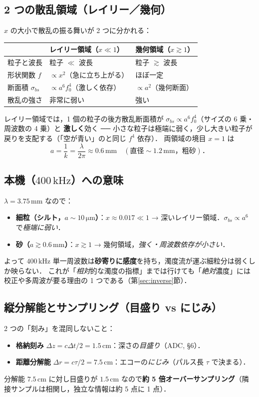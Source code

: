 \documentclass[11pt]{ltjsarticle}
\newcommand{\unit}[1]{\,\mathrm{#1}}
\begin{document}
\subsection{2 つの散乱領域（レイリー／幾何）}
$x$ の大小で散乱の振る舞いが 2 つに分かれる：
\begin{center}\small
\begin{tabular}{lll}
\toprule
 & レイリー領域（$x\ll1$） & 幾何領域（$x\gtrsim1$） \\
\midrule
粒子と波長 & 粒子 $\ll$ 波長 & 粒子 $\gtrsim$ 波長 \\
形状関数 $f$ & $\propto x^2$（急に立ち上がる） & ほぼ一定 \\
断面積 $\sigma_{bs}$ & $\propto a^6 f_0^4$（激しく依存） & $\propto a^2$（幾何断面） \\
散乱の強さ & 非常に弱い & 強い \\
\bottomrule
\end{tabular}
\end{center}
レイリー領域では，1 個の粒子の後方散乱断面積が $\sigma_{bs}\propto a^6 f_0^4$（サイズの 6 乗・周波数の 4 乗）と
\textbf{激しく}効く ── 小さな粒子は極端に弱く，少し大きい粒子が戻りを支配する（「空が青い」のと同じ $f^4$ 依存）．
両領域の境目 $x=1$ は
\begin{equation}
a=\frac{1}{k}=\frac{\lambda}{2\pi}\approx 0.6\unit{mm}\quad(\text{直径}\sim1.2\unit{mm}，粗砂)．
\end{equation}

\subsection{本機（$400\unit{kHz}$）への意味}
$\lambda=3.75\unit{mm}$ なので：
\begin{itemize}[nosep]
  \item \textbf{細粒（シルト，$a\sim10\unit{\mu m}$）}：$x\approx0.017\ll1$ → 深いレイリー領域．$\sigma_{bs}\propto a^6$ で\emph{極端に弱い}．
  \item \textbf{砂（$a\gtrsim0.6\unit{mm}$）}：$x\gtrsim1$ → 幾何領域，\emph{強く・周波数依存が小さい}．
\end{itemize}
よって $400\unit{kHz}$ 単一周波数は\textbf{砂寄りに感度}を持ち，濁度流が運ぶ細粒分は弱くしか映らない．
これが「\emph{相対}的な濁度の指標」までは行けても「\emph{絶対}濃度」には校正や多周波が要る理由の 1 つである（第\ref{sec:inverse}節）．

\subsection{縦分解能とサンプリング（目盛り vs にじみ）}
2 つの「刻み」を混同しないこと：
\begin{itemize}[nosep]
  \item \textbf{格納刻み} $\Delta z=c\Delta t/2=1.5\unit{cm}$：深さの\emph{目盛り}（ADC, \S6）．
  \item \textbf{距離分解能} $\Delta r=c\tau/2=7.5\unit{cm}$：エコーの\emph{にじみ}（パルス長 $\tau$ で決まる）．
\end{itemize}
分解能 $7.5\unit{cm}$ に対し目盛りが $1.5\unit{cm}$ なので\textbf{約 5 倍オーバーサンプリング}（隣接サンプルは相関し，独立な情報は約 5 点に 1 点）．
\end{document}
